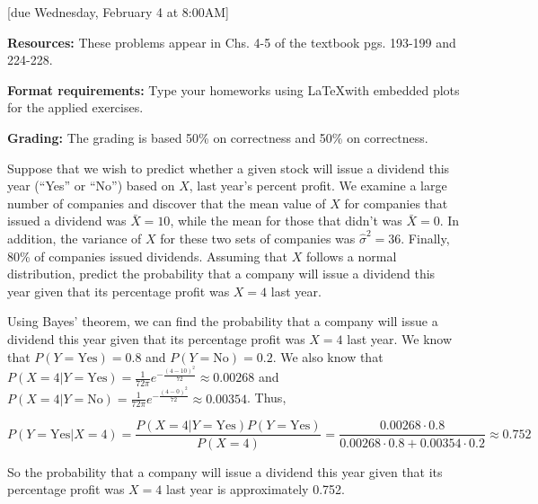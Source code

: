 \documentclass{article}
\begin{document}
[due Wednesday, February 4 at 8:00AM]

\textbf{Resources:} These problems appear in Chs. 4-5 of the textbook pgs. 193-199 and 224-228.

\textbf{Format requirements:} Type your homeworks using \LaTeX with embedded plots for the applied exercises.

\textbf{Grading:} The grading is based 50\% on correctness and 50\% on correctness.

\vspace{1em}

\begin{probset}

\begin{prob}
    Suppose that we wish to predict whether a given stock will issue a dividend this year (“Yes” or “No”) based on $X$, last year's percent profit. We examine a large number of companies and discover that the mean value of $X$ for companies that issued a dividend was $\bar{X} = 10$, while the mean for those that didn't was $\bar{X} = 0$. In addition, the variance of $X$ for these two sets of companies was $\hat{\sigma}^2 = 36$. Finally, 80\% of companies issued dividends. Assuming that $X$ follows a normal distribution, predict the probability that a company will issue a dividend this year given that its percentage profit was $X = 4$ last year.

    \begin{soln}
        Using Bayes' theorem, we can find the probability that a company will issue a dividend this year given that its percentage profit was $X = 4$ last year. We know that $P(Y = \text{Yes}) = 0.8$ and $P(Y = \text{No}) = 0.2$. We also know that $P(X = 4 | Y = \text{Yes}) = \frac{1}{72\pi} e^{-\frac{(4 - 10)^2}{72}} \approx 0.00268$ and $P(X = 4 | Y = \text{No}) = \frac{1}{72\pi} e^{-\frac{(4 - 0)^2}{72}} \approx 0.00354$. Thus,

        \[
            P(Y = \text{Yes} | X = 4) = \frac{P(X = 4 | Y = \text{Yes}) P(Y = \text{Yes})}{P(X = 4)} = \frac{0.00268 \cdot 0.8}{0.00268 \cdot 0.8 + 0.00354 \cdot 0.2} \approx 0.752
        \]

        So the probability that a company will issue a dividend this year given that its percentage profit was $X = 4$ last year is approximately 0.752.
    \end{soln}
\end{prob}


\end{probset}
\end{document}
